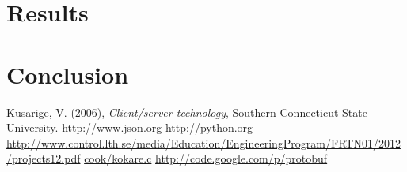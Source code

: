 \documentclass{article}
\begin{document}
\section{Results}

\section{Conclusion}

\newpage

\begin{thebibliography}{9}
Kusarige, V. (2006), \emph{Client/server technology}, Southern Connecticut State University.
\url{http://www.json.org}
\url{http://python.org}
\url{http://www.control.lth.se/media/Education/EngineeringProgram/FRTN01/2012/projects12.pdf}
\url{cook/kokare.c}
\url{http://code.google.com/p/protobuf}
\end{thebibliography}
\end{document}

